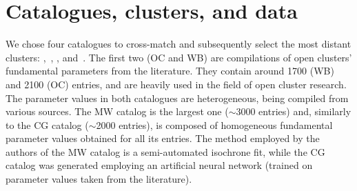 \documentclass{aa}
\begin{document}
\section{Catalogues, clusters, and data}
 \label{sec:cat_clust_data}

 We chose four catalogues to cross-match and subsequently select the most
 distant clusters: \citet[][New Catalog of Optically Visible Open Clusters and
 Candidates, hereinafter OC]{Dias_2002},~\citet[][WEBDA,\footnote{
 \url{https://webda.physics.muni.cz/}} hereinafter WB]{Netopil_2012},
 \citet[][Milky Way Star Clusters Catalog, hereinafter MW]{Kharchenko_2012},
 and~\citet[][hereinafter CG]{Cantat_2020}.
 The first two (OC and WB) are compilations of open clusters' fundamental
 parameters from the literature. They contain around 1700 (WB) and 2100 
 (OC) entries, and are heavily used in the field of open cluster research.
 The parameter values in both catalogues are heterogeneous, being compiled from
 various sources.
 The MW catalog is the largest one ($\sim$3000 entries) and, similarly to the CG
 catalog ($\sim$2000 entries), is composed of homogeneous fundamental parameter
 values obtained for all its entries. The method employed by the authors of the
 MW catalog is a semi-automated isochrone fit, while the CG catalog was
 generated employing an artificial neural network (trained on parameter values
 taken from the literature).
\end{document}
